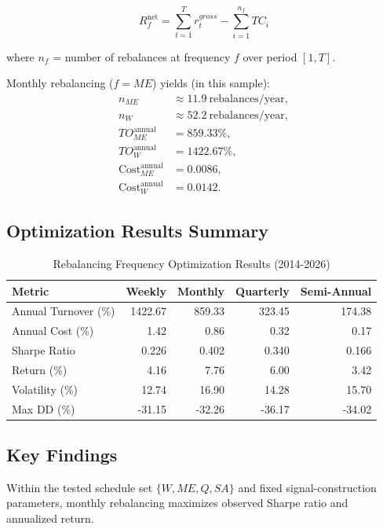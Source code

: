 \documentclass[twocolumn,ieee]{Base_Latex_Template/arithmaxresearch}
\begin{document}
$$R_f^{\text{net}} = \sum_{t=1}^{T} r_t^{gross} - \sum_{i=1}^{n_f} TC_i$$

where $n_f$ = number of rebalances at frequency $f$ over period $[1, T]$.

Monthly rebalancing ($f = ME$) yields (in this sample):
\begin{align}
n_{ME} &\approx 11.9\ \text{rebalances/year}, \\
n_{W} &\approx 52.2\ \text{rebalances/year}, \\
TO_{ME}^{\text{annual}} &= 859.33\%, \\
TO_{W}^{\text{annual}} &= 1422.67\%, \\
\text{Cost}_{ME}^{\text{annual}} &= 0.0086, \\
\text{Cost}_{W}^{\text{annual}} &= 0.0142.
\end{align}

\subsection{Optimization Results Summary}

\begin{table}[h]
\centering
\scriptsize
\setlength{\tabcolsep}{3.5pt}
\renewcommand{\arraystretch}{0.95}
\begin{tabular}{lrrrr}
\hline
\textbf{Metric} & \textbf{Weekly} & \textbf{Monthly} & \textbf{Quarterly} & \textbf{Semi-Annual} \\
\hline
Annual Turnover (\%) & 1422.67 & 859.33 & 323.45 & 174.38 \\
Annual Cost (\%) & 1.42 & 0.86 & 0.32 & 0.17 \\
Sharpe Ratio & 0.226 & 0.402 & 0.340 & 0.166 \\
Return (\%) & 4.16 & 7.76 & 6.00 & 3.42 \\
Volatility (\%) & 12.74 & 16.90 & 14.28 & 15.70 \\
Max DD (\%) & -31.15 & -32.26 & -36.17 & -34.02 \\
\hline
\end{tabular}
\caption{Rebalancing Frequency Optimization Results (2014-2026)}
\label{tab:freq_optimization}
\end{table}
\renewcommand{\arraystretch}{1.0}

\subsection{Key Findings}

\begin{theorem}
Within the tested schedule set $\{W, ME, Q, SA\}$ and fixed signal-construction parameters, monthly rebalancing maximizes observed Sharpe ratio and annualized return.
\end{theorem}
\end{document}

